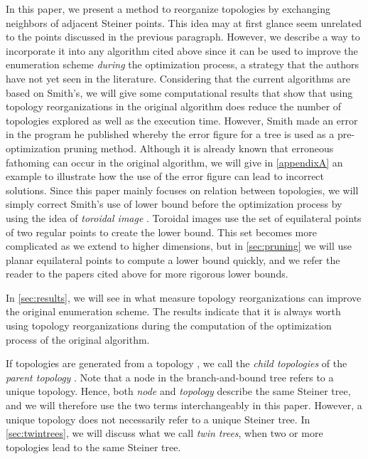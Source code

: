 \documentclass{article}
\theoremstyle{plain}
\begin{document}
In this paper, we present a method to reorganize topologies by exchanging neighbors of adjacent Steiner points. 
This idea may at first glance seem unrelated to the points discussed in the previous paragraph. 
However, we describe a way to incorporate it into any algorithm cited above since it can be used to improve the enumeration scheme \emph{during} the optimization process, a strategy that the authors have not yet seen in the literature. 
Considering that the current algorithms are based on Smith's, we will give some computational results that show that using topology reorganizations in the original algorithm does reduce the number of topologies explored as well as the execution time. 
However, Smith made an error in the program he published whereby the error figure for a tree is used as a pre-optimization pruning method. 
Although it is already known that erroneous fathoming can occur in the original algorithm, we will give in \cref{appendixA} an example to illustrate how the use of the error figure can lead to incorrect solutions. 
Since this paper mainly focuses on relation between topologies, we will simply correct Smith's use of lower bound before the optimization process by using the idea of \emph{toroidal image} \cite{ref2}. 
Toroidal images use the set of equilateral points of two regular points to create the lower bound. 
This set becomes more complicated as we extend to higher dimensions, but in \cref{sec:pruning} we will use planar equilateral points to compute a lower bound quickly, and we refer the reader to the papers cited above for more rigorous lower bounds. 


In \cref{sec:results}, we will see in what measure topology reorganizations can improve the original enumeration scheme. 
The results indicate that it is always worth using topology reorganizations during the computation of the optimization process of the original algorithm.

If topologies  are generated from a topology , we call  the \emph{child topologies} of the \emph{parent topology} . 
Note that a node in the \mbox{branch-and-bound} tree refers to a unique topology. 
Hence, both \emph{node} and \emph{topology} describe the same Steiner tree, and we will therefore use the two terms interchangeably in this paper. 
However, a unique topology does not necessarily refer to a unique Steiner tree. 
In \cref{sec:twintrees}, we will discuss what we call \emph{twin trees}, when two or more topologies lead to the same Steiner tree.
\end{document}

